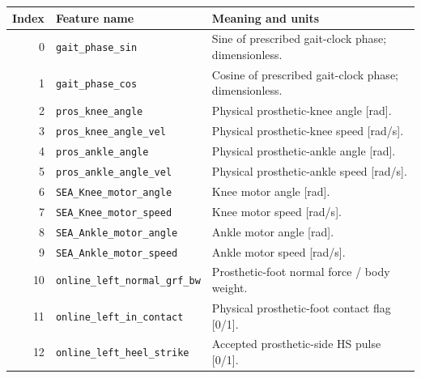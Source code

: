 {\footnotesize
\begin{longtable}{@{}r p{7.2cm} p{7.5cm}@{}}
\toprule Index & Feature name & Meaning and units\\\midrule\endhead
0 & {\fontsize{7.6}{9.2}\selectfont\texttt{gait\_\allowbreak{}phase\_\allowbreak{}sin}} & Sine of prescribed gait-clock phase; dimensionless.\\
1 & {\fontsize{7.6}{9.2}\selectfont\texttt{gait\_\allowbreak{}phase\_\allowbreak{}cos}} & Cosine of prescribed gait-clock phase; dimensionless.\\
2 & {\fontsize{7.6}{9.2}\selectfont\texttt{pros\_\allowbreak{}knee\_\allowbreak{}angle}} & Physical prosthetic-knee angle [rad].\\
3 & {\fontsize{7.6}{9.2}\selectfont\texttt{pros\_\allowbreak{}knee\_\allowbreak{}angle\_\allowbreak{}vel}} & Physical prosthetic-knee speed [rad/s].\\
4 & {\fontsize{7.6}{9.2}\selectfont\texttt{pros\_\allowbreak{}ankle\_\allowbreak{}angle}} & Physical prosthetic-ankle angle [rad].\\
5 & {\fontsize{7.6}{9.2}\selectfont\texttt{pros\_\allowbreak{}ankle\_\allowbreak{}angle\_\allowbreak{}vel}} & Physical prosthetic-ankle speed [rad/s].\\
6 & {\fontsize{7.6}{9.2}\selectfont\texttt{SEA\_\allowbreak{}Knee\_\allowbreak{}motor\_\allowbreak{}angle}} & Knee motor angle [rad].\\
7 & {\fontsize{7.6}{9.2}\selectfont\texttt{SEA\_\allowbreak{}Knee\_\allowbreak{}motor\_\allowbreak{}speed}} & Knee motor speed [rad/s].\\
8 & {\fontsize{7.6}{9.2}\selectfont\texttt{SEA\_\allowbreak{}Ankle\_\allowbreak{}motor\_\allowbreak{}angle}} & Ankle motor angle [rad].\\
9 & {\fontsize{7.6}{9.2}\selectfont\texttt{SEA\_\allowbreak{}Ankle\_\allowbreak{}motor\_\allowbreak{}speed}} & Ankle motor speed [rad/s].\\
10 & {\fontsize{7.6}{9.2}\selectfont\texttt{online\_\allowbreak{}left\_\allowbreak{}normal\_\allowbreak{}grf\_\allowbreak{}bw}} & Prosthetic-foot normal force / body weight.\\
11 & {\fontsize{7.6}{9.2}\selectfont\texttt{online\_\allowbreak{}left\_\allowbreak{}in\_\allowbreak{}contact}} & Physical prosthetic-foot contact flag [0/1].\\
12 & {\fontsize{7.6}{9.2}\selectfont\texttt{online\_\allowbreak{}left\_\allowbreak{}heel\_\allowbreak{}strike}} & Accepted prosthetic-side HS pulse [0/1].\\

\end{longtable}}
